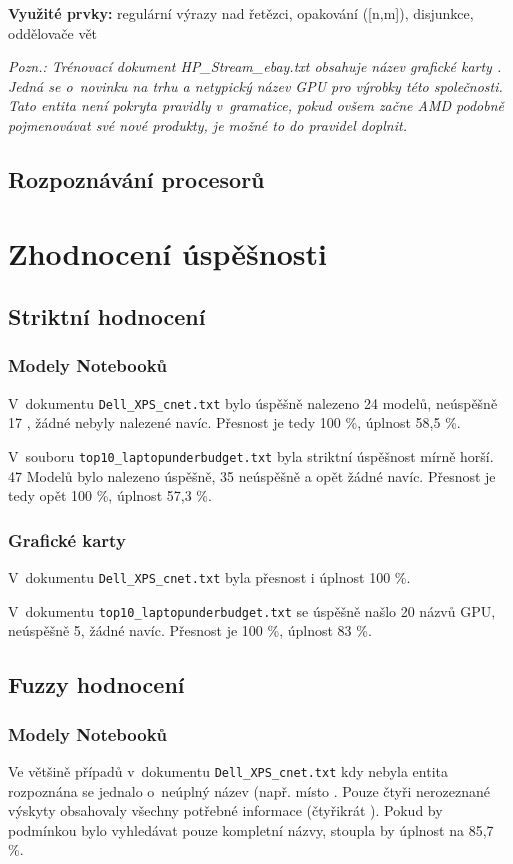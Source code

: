 \documentclass[a4,12pt]{article}
\let\Oldsection\section
\renewcommand{\section}{\FloatBarrier\Oldsection}
\let\Oldsubsection\subsection
\renewcommand{\subsection}{\FloatBarrier\Oldsubsection}
\let\Oldsubsubsection\subsubsection
\renewcommand{\subsubsection}{\FloatBarrier\Oldsubsubsection}
\begin{document}
\textbf{Využité prvky:} regulární výrazy nad řetězci, opakování ([n,m]), disjunkce, oddělovače vět 

\textit{Pozn.: Trénovací dokument HP\_Stream\_ebay.txt obsahuje název grafické karty . Jedná se o~novinku na trhu a netypický název GPU pro výrobky této společnosti. Tato entita není pokryta pravidly v~gramatice, pokud ovšem začne AMD podobně pojmenovávat své nové produkty, je možné to do pravidel doplnit.}
\subsection{Rozpoznávání procesorů}
\section{Zhodnocení úspěšnosti}
\subsection{Striktní hodnocení}
\subsubsection{Modely Notebooků}
V~dokumentu \texttt{Dell\_XPS\_cnet.txt} bylo úspěšně nalezeno 24 modelů, neúspěšně 17 , žádné nebyly nalezené navíc. Přesnost je tedy 100 \%, úplnost 58,5 \%.

V~souboru \texttt{top10\_laptopunderbudget.txt} byla striktní úspěšnost mírně horší. 47 Modelů bylo nalezeno úspěšně, 35 neúspěšně a opět žádné navíc. Přesnost je tedy opět 100 \%, úplnost 57,3 \%.

\subsubsection{Grafické karty}
V~dokumentu \texttt{Dell\_XPS\_cnet.txt} byla přesnost i úplnost 100 \%.

V~dokumentu \texttt{top10\_laptopunderbudget.txt} se úspěšně našlo 20 názvů GPU, neúspěšně 5, žádné navíc. Přesnost je 100 \%, úplnost 83 \%.
\subsection{Fuzzy hodnocení}
\subsubsection{Modely Notebooků}
Ve většině případů v~dokumentu \texttt{Dell\_XPS\_cnet.txt} kdy nebyla entita rozpoznána se jednalo o~neúplný název (např.  místo . Pouze čtyři nerozeznané výskyty obsahovaly všechny potřebné informace (čtyřikrát ). Pokud by podmínkou bylo vyhledávat pouze kompletní názvy, stoupla by úplnost na 85,7 \%.
\end{document}
